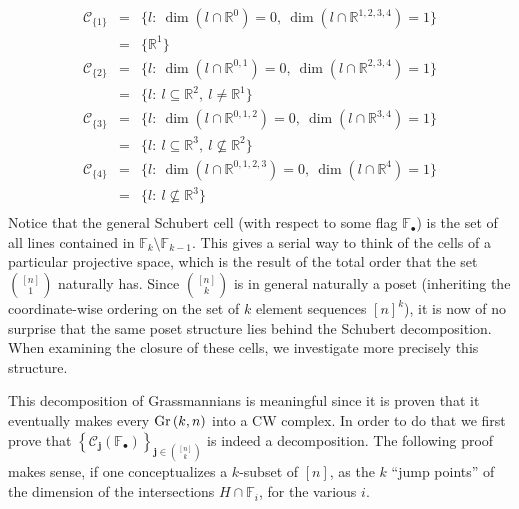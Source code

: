 \[\begin{array}{rcl}
\mathcal{C}_{\{1\}}&=&\big\{l:\ \dim(l\cap\mathbb{R}^{0})=0,\ \dim(l\cap\mathbb{R}^{1,2,3,4})=1\big\}\\
&=&\big\{\mathbb{R}^1\big\}\\[.6em]
\mathcal{C}_{\{2\}}&=&\big\{l:\ \dim(l\cap\mathbb{R}^{0,1})=0,\ \dim(l\cap\mathbb{R}^{2,3,4})=1\big\}\\
&=&\big\{l:\ l\subseteq\mathbb{R}^2,\ l\neq\mathbb{R}^1\big\}\\[.6em]
\mathcal{C}_{\{3\}}&=&\big\{l:\ \dim(l\cap\mathbb{R}^{0,1,2})=0,\ \dim(l\cap\mathbb{R}^{3,4})=1\big\}\\
&=&\big\{l:\ l\subseteq\mathbb{R}^3,\ l\not\subseteq\mathbb{R}^2\big\}\\[.6em]
\mathcal{C}_{\{4\}}&=&\big\{l:\ \dim(l\cap\mathbb{R}^{0,1,2,3})=0,\ \dim(l\cap\mathbb{R}^{4})=1\big\}\\
&=&\big\{l:\ l\not\subseteq\mathbb{R}^3\big\}\\[.6em]
\end{array}\]
Notice that the general Schubert cell (with respect to some flag $\mathbb{F}_{\bullet}$) is the set of all lines contained in $\mathbb{F}_k\setminus\mathbb{F}_{k-1}$.
This gives a serial way to think of the cells of a particular projective space, which is the result of the total order that the set $\binom{[n]}{1}$ naturally has. Since $\binom{[n]}{k}$ is in general naturally a poset (inheriting the coordinate-wise ordering on the set of $k$ element sequences ${[n]}^k$), it is now of no surprise that the same poset structure lies behind the Schubert decomposition.
When examining the closure of these cells, we investigate more precisely this structure.

This decomposition of Grassmannians is meaningful since it is proven that it eventually makes every $\Gr{k}{n}$ into a CW complex. In order to do that we first prove that
${\left\{\mathcal{C}_{\mathbf{j}}(\mathbb{F}_{\bullet})\right\}}_{\mathbf{j}\in\binom{[n]}{k}}$ is indeed a decomposition. The following proof makes sense, if one conceptualizes a $k$-subset of $[n]$, as the $k$ ``jump points'' of the dimension of the intersections $H\cap\mathbb{F}_i$, for the various $i$.

